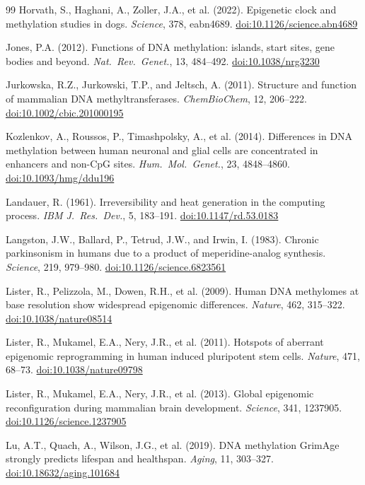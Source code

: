 \documentclass[12pt,a4paper]{article}
\newcommand{\doi}[1]{\href{https://doi.org/#1}{doi:#1}}
\begin{document}
\begin{thebibliography}{99}
Horvath, S., Haghani, A., Zoller, J.A., et al. (2022).
Epigenetic clock and methylation studies in dogs.
\textit{Science}, 378, eabn4689.
\doi{10.1126/science.abn4689}

Jones, P.A. (2012).
Functions of DNA methylation: islands, start sites, gene bodies and beyond.
\textit{Nat.\ Rev.\ Genet.}, 13, 484--492.
\doi{10.1038/nrg3230}

Jurkowska, R.Z., Jurkowski, T.P., and Jeltsch, A. (2011).
Structure and function of mammalian DNA methyltransferases.
\textit{ChemBioChem}, 12, 206--222.
\doi{10.1002/cbic.201000195}

Kozlenkov, A., Roussos, P., Timashpolsky, A., et al. (2014).
Differences in DNA methylation between human neuronal and glial cells are concentrated in enhancers and non-CpG sites.
\textit{Hum.\ Mol.\ Genet.}, 23, 4848--4860.
\doi{10.1093/hmg/ddu196}

Landauer, R. (1961).
Irreversibility and heat generation in the computing process.
\textit{IBM J.\ Res.\ Dev.}, 5, 183--191.
\doi{10.1147/rd.53.0183}

Langston, J.W., Ballard, P., Tetrud, J.W., and Irwin, I. (1983).
Chronic parkinsonism in humans due to a product of meperidine-analog synthesis.
\textit{Science}, 219, 979--980.
\doi{10.1126/science.6823561}

Lister, R., Pelizzola, M., Dowen, R.H., et al. (2009).
Human DNA methylomes at base resolution show widespread epigenomic differences.
\textit{Nature}, 462, 315--322.
\doi{10.1038/nature08514}

Lister, R., Mukamel, E.A., Nery, J.R., et al. (2011).
Hotspots of aberrant epigenomic reprogramming in human induced pluripotent stem cells.
\textit{Nature}, 471, 68--73.
\doi{10.1038/nature09798}

Lister, R., Mukamel, E.A., Nery, J.R., et al. (2013).
Global epigenomic reconfiguration during mammalian brain development.
\textit{Science}, 341, 1237905.
\doi{10.1126/science.1237905}

Lu, A.T., Quach, A., Wilson, J.G., et al. (2019).
DNA methylation GrimAge strongly predicts lifespan and healthspan.
\textit{Aging}, 11, 303--327.
\doi{10.18632/aging.101684}


\end{thebibliography}
\end{document}
